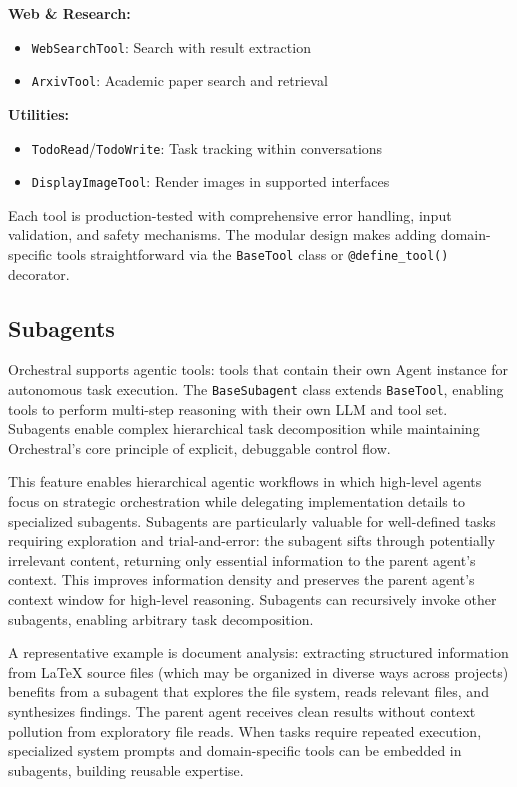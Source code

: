 \documentclass{article}
\begin{document}
\textbf{Web \& Research:}
\begin{itemize}
    \item \texttt{WebSearchTool}: Search with result extraction
    \item \texttt{ArxivTool}: Academic paper search and retrieval
\end{itemize}

\textbf{Utilities:}
\begin{itemize}
    \item \texttt{TodoRead}/\texttt{TodoWrite}: Task tracking within conversations
    \item \texttt{DisplayImageTool}: Render images in supported interfaces
\end{itemize}

Each tool is production-tested with comprehensive error handling, input validation, and safety mechanisms. The modular design makes adding domain-specific tools straightforward via the \texttt{BaseTool} class or \texttt{@define\_tool()} decorator.

\subsection{Subagents}

Orchestral supports agentic tools: tools that contain their own Agent instance for autonomous task execution. The \texttt{BaseSubagent} class extends \texttt{BaseTool}, enabling tools to perform multi-step reasoning with their own LLM and tool set. Subagents enable complex hierarchical task decomposition while maintaining Orchestral's core principle of explicit, debuggable control flow.

This feature enables hierarchical agentic workflows in which high-level agents focus on strategic orchestration while delegating implementation details to specialized subagents. Subagents are particularly valuable for well-defined tasks requiring exploration and trial-and-error: the subagent sifts through potentially irrelevant content, returning only essential information to the parent agent's context. This improves information density and preserves the parent agent's context window for high-level reasoning. Subagents can recursively invoke other subagents, enabling arbitrary task decomposition.

A representative example is document analysis: extracting structured information from LaTeX source files (which may be organized in diverse ways across projects) benefits from a subagent that explores the file system, reads relevant files, and synthesizes findings. The parent agent receives clean results without context pollution from exploratory file reads. When tasks require repeated execution, specialized system prompts and domain-specific tools can be embedded in subagents, building reusable expertise.
\end{document}
